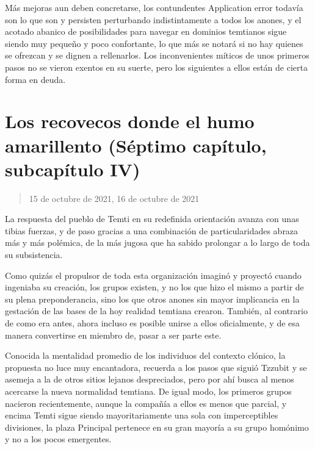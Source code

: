 \documentclass[
  spanish,
]{book}
\begin{document}
Más mejoras aun deben concretarse, los contundentes Application error todavía son lo que son y persisten perturbando indistintamente a todos los anones, y el acotado abanico de posibilidades para navegar en dominios temtianos sigue siendo muy pequeño y poco confortante, lo que más se notará si no hay quienes se ofrezcan y se dignen a rellenarlos. Los inconvenientes míticos de unos primeros pasos no se vieron exentos en su suerte, pero los siguientes a ellos están de cierta forma en deuda.

\hypertarget{los-recovecos-donde-el-humo-amarillento-suxe9ptimo-capuxedtulo-subcapuxedtulo-iv}{%
\section{Los recovecos donde el humo amarillento (Séptimo capítulo, subcapítulo IV)}\label{los-recovecos-donde-el-humo-amarillento-suxe9ptimo-capuxedtulo-subcapuxedtulo-iv}}

\begin{quote}
15 de octubre de 2021, 16 de octubre de 2021
\end{quote}

La respuesta del pueblo de Temti en su redefinida orientación avanza con unas tibias fuerzas, y de paso gracias a una combinación de particularidades abraza más y más polémica, de la más jugosa que ha sabido prolongar a lo largo de toda su subsistencia.

Como quizás el propulsor de toda esta organización imaginó y proyectó cuando ingeniaba su creación, los grupos existen, y no los que hizo el mismo a partir de su plena preponderancia, sino los que otros anones sin mayor implicancia en la gestación de las bases de la hoy realidad temtiana crearon. También, al contrario de como era antes, ahora incluso es posible unirse a ellos oficialmente, y de esa manera convertirse en miembro de, pasar a ser parte este.

Conocida la mentalidad promedio de los individuos del contexto clónico, la propuesta no luce muy encantadora, recuerda a los pasos que siguió Tzzubit y se asemeja a la de otros sitios lejanos despreciados, pero por ahí busca al menos acercarse la nueva normalidad temtiana. De igual modo, los primeros grupos nacieron recientemente, aunque la compañía a ellos es menos que parcial, y encima Temti sigue siendo mayoritariamente una sola con imperceptibles divisiones, la plaza Principal pertenece en su gran mayoría a su grupo homónimo y no a los pocos emergentes.
\end{document}
